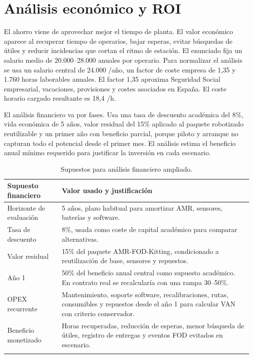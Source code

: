 \chapter{Análisis económico y ROI}

El ahorro viene de aprovechar mejor el tiempo de planta. El valor económico aparece al recuperar tiempo de operarios, bajar esperas, evitar búsquedas de útiles y reducir incidencias que cortan el ritmo de estación. El enunciado fija un salario medio de 20.000--28.000 \texteuro{} anuales por operario. Para normalizar el análisis se usa un salario central de 24.000 \texteuro{}/año, un factor de coste empresa de 1,35 y 1.760 horas laborables anuales. El factor 1,35 aproxima Seguridad Social empresarial, vacaciones, provisiones y costes asociados en España. El coste horario cargado resultante es 18,4 \texteuro{}/h.

El análisis financiero va por fases. Usa una tasa de descuento académica del 8\%, vida económica de 5 años, valor residual del 15\% aplicado al paquete robotizado reutilizable y un primer año con beneficio parcial, porque piloto y arranque no capturan todo el potencial desde el primer mes. El análisis estima el beneficio anual mínimo requerido para justificar la inversión en cada escenario.

\begin{longtable}{P{0.32\textwidth}P{0.50\textwidth}}
\toprule
Supuesto financiero & Valor usado y justificación\\
\midrule
\endhead
Horizonte de evaluación & 5 años, plazo habitual para amortizar AMR, sensores, baterías y software.\\
Tasa de descuento & 8\%, usada como coste de capital académico para comparar alternativas.\\
Valor residual & 15\% del paquete AMR-FOD-Kitting, condicionado a reutilización de base, sensores y repuestos.\\
Año 1 & 50\% del beneficio anual central como supuesto académico. En contrato real se recalcularía con una rampa 30--50\%.\\
OPEX recurrente & Mantenimiento, soporte software, recalibraciones, rutas, consumibles y repuestos desde el año 1 para calcular VAN con criterio conservador.\\
Beneficio monetizado & Horas recuperadas, reducción de esperas, menor búsqueda de útiles, registro de entregas y eventos FOD evitados en escenario.\\
\bottomrule
\caption{Supuestos para análisis financiero ampliado.}
\label{tab:supuestos-financieros}
\end{longtable}

